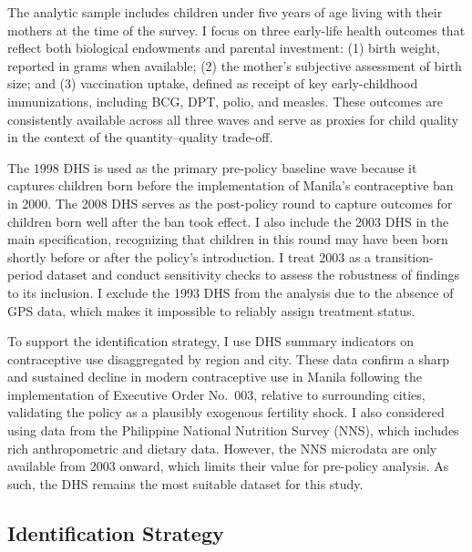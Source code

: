 \documentclass[]{AEA}
\begin{document}
The analytic sample includes children under five years of age living
with their mothers at the time of the survey. I focus on three
early-life health outcomes that reflect both biological endowments and
parental investment: (1) birth weight, reported in grams when available;
(2) the mother's subjective assessment of birth size; and (3)
vaccination uptake, defined as receipt of key early-childhood
immunizations, including BCG, DPT, polio, and measles. These outcomes
are consistently available across all three waves and serve as proxies
for child quality in the context of the quantity--quality trade-off.

The 1998 DHS is used as the primary pre-policy baseline wave because it
captures children born before the implementation of Manila's
contraceptive ban in 2000. The 2008 DHS serves as the post-policy round
to capture outcomes for children born well after the ban took effect. I
also include the 2003 DHS in the main specification, recognizing that
children in this round may have been born shortly before or after the
policy's introduction. I treat 2003 as a transition-period dataset and
conduct sensitivity checks to assess the robustness of findings to its
inclusion. I exclude the 1993 DHS from the analysis due to the absence
of GPS data, which makes it impossible to reliably assign treatment
status.

To support the identification strategy, I use DHS summary indicators on
contraceptive use disaggregated by region and city. These data confirm a
sharp and sustained decline in modern contraceptive use in Manila
following the implementation of Executive Order No.~003, relative to
surrounding cities, validating the policy as a plausibly exogenous
fertility shock. I also considered using data from the Philippine
National Nutrition Survey (NNS), which includes rich anthropometric and
dietary data. However, the NNS microdata are only available from 2003
onward, which limits their value for pre-policy analysis. As such, the
DHS remains the most suitable dataset for this study.

\subsection{Identification Strategy}
\end{document}

